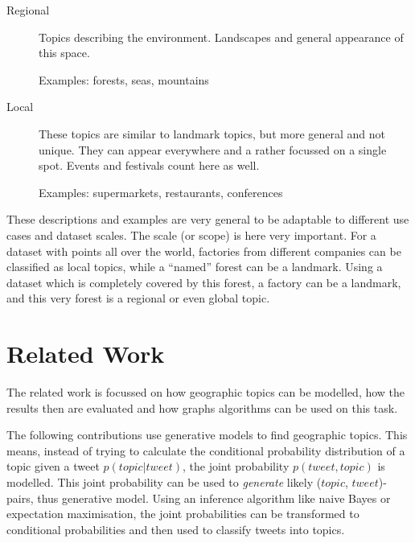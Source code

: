 \begin{description}
\item[Regional] Topics describing the environment. Landscapes and general appearance of this space.

Examples: forests, seas, mountains

\item[Local] These topics are similar to landmark topics, but more general and not unique. They can appear everywhere and a rather focussed on a single spot. Events and festivals count here as well.

Examples: supermarkets, restaurants, conferences

\end{description}
%
These descriptions and examples are very general to be adaptable to different use cases and dataset scales. The scale (or scope) is here very important. For a dataset with points all over the world, factories from different companies can be classified as local topics, while a \enquote{named} forest can be a landmark. Using a dataset which is completely covered by this forest, a factory can be a landmark, and this very forest is a regional or even global topic.



\section{Related Work}
The related work is focussed on how geographic topics can be modelled, how the results then are evaluated and how graphs algorithms can be used on this task.

The following contributions use generative models to find geographic topics. This means, instead of trying to calculate the conditional probability distribution of a topic given a tweet $p(topic | tweet)$, the joint probability $p(tweet, topic)$ is modelled. This joint probability can be used to \emph{generate} likely ($topic$, $tweet$)-pairs, thus generative model. Using an inference algorithm like naive Bayes or expectation maximisation, the joint probabilities can be transformed to conditional probabilities and then used to classify tweets into topics.


